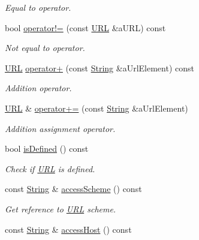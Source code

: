 \begin{DoxyCompactItemize}
\begin{DoxyCompactList}\small\item\em Equal to operator. \end{DoxyCompactList}\item 
bool \hyperlink{classlibrary_1_1io_1_1_u_r_l_a821743d11216826fa475d9b87f37e6cb}{operator!=} (const \hyperlink{classlibrary_1_1io_1_1_u_r_l}{U\+RL} \&a\+U\+RL) const
\begin{DoxyCompactList}\small\item\em Not equal to operator. \end{DoxyCompactList}\item 
\hyperlink{classlibrary_1_1io_1_1_u_r_l}{U\+RL} \hyperlink{classlibrary_1_1io_1_1_u_r_l_a1a2d5bb517344d5ce72e8dc48c86fef1}{operator+} (const \hyperlink{namespacelibrary_1_1io_a7469b45835a4421045db344d6a5a1f85}{String} \&a\+Url\+Element) const
\begin{DoxyCompactList}\small\item\em Addition operator. \end{DoxyCompactList}\item 
\hyperlink{classlibrary_1_1io_1_1_u_r_l}{U\+RL} \& \hyperlink{classlibrary_1_1io_1_1_u_r_l_a03c4127e3d9e7e44b5d5f1dcd4db950c}{operator+=} (const \hyperlink{namespacelibrary_1_1io_a7469b45835a4421045db344d6a5a1f85}{String} \&a\+Url\+Element)
\begin{DoxyCompactList}\small\item\em Addition assignment operator. \end{DoxyCompactList}\item 
bool \hyperlink{classlibrary_1_1io_1_1_u_r_l_af0f1c5720acae0e2bd71404a35199546}{is\+Defined} () const
\begin{DoxyCompactList}\small\item\em Check if \hyperlink{classlibrary_1_1io_1_1_u_r_l}{U\+RL} is defined. \end{DoxyCompactList}\item 
const \hyperlink{namespacelibrary_1_1io_a7469b45835a4421045db344d6a5a1f85}{String} \& \hyperlink{classlibrary_1_1io_1_1_u_r_l_a01c171ddf3398a26bb3453d72ff73954}{access\+Scheme} () const
\begin{DoxyCompactList}\small\item\em Get reference to \hyperlink{classlibrary_1_1io_1_1_u_r_l}{U\+RL} scheme. \end{DoxyCompactList}\item 
const \hyperlink{namespacelibrary_1_1io_a7469b45835a4421045db344d6a5a1f85}{String} \& \hyperlink{classlibrary_1_1io_1_1_u_r_l_a14c7741f6259f124d22551c34a7bb746}{access\+Host} () const

\end{DoxyCompactItemize}
